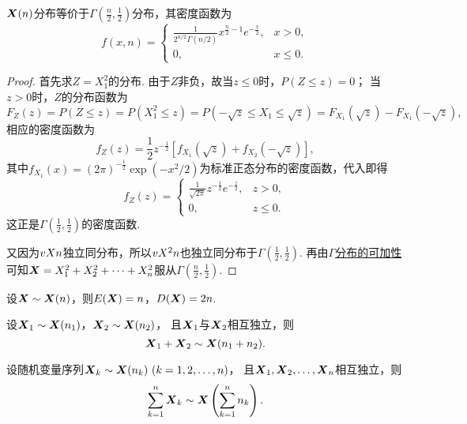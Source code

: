 \begin{theorem}\label{theorem:数理统计的基础知识.卡方分布的密度函数}
\(\boldsymbol{X}(n)\)分布等价于\(\Gamma\left(\frac{n}{2},\frac{1}{2}\right)\)分布，其密度函数为\[
f(x,n) = \left\{ \begin{array}{cl}
\frac{1}{2^{n/2} \Gamma(n/2)} x^{\frac{n}{2}-1} e^{-\frac{x}{2}}, & x > 0, \\
0, & x \leqslant 0.
\end{array} \right.
\]
\begin{proof}
首先求\(Z=X_1^2\)的分布.
由于\(Z\)非负，故当\(z \leqslant 0\)时，\(P(Z \leqslant z) = 0\)；
当\(z > 0\)时，\(Z\)的分布函数为\[
F_Z(z) = P(Z \leqslant z)
= P(X_1^2 \leqslant z)
= P(-\sqrt{z} \leqslant X_1 \leqslant \sqrt{z})
= F_{X_1}(\sqrt{z}) - F_{X_1}(-\sqrt{z}),
\]相应的密度函数为\[
f_Z(z) = \frac{1}{2} z^{-\frac{1}{2}} \left[
f_{X_1}(\sqrt{z}) + f_{X_2}(-\sqrt{z})
\right],
\]其中\(f_{X_1}(x) = (2\pi)^{-\frac{1}{2}} \exp(-x^2/2)\)为标准正态分布的密度函数，代入即得\[
f_Z(z) = \left\{ \begin{array}{cl}
\frac{1}{\sqrt{2\pi}} z^{-\frac{1}{2}} e^{-\frac{z}{2}}, & z>0, \\
0, & z \leqslant 0.
\end{array} \right.
\]这正是\(\Gamma\left(\frac{1}{2},\frac{1}{2}\right)\)的密度函数.

又因为\(v{X}{n}\)独立同分布，所以\(v{X^2}{n}\)也独立同分布于\(\Gamma\left(\frac{1}{2},\frac{1}{2}\right)\).
再由\hyperref[theorem:多维随机变量及其分布.伽马分布的可加性1]{\(\Gamma\)分布的可加性}可知\(\boldsymbol{X} = X_1^2+X_2^2+\dotsb+X_n^2\)服从\(\Gamma\left(\frac{n}{2},\frac{1}{2}\right)\).
\end{proof}
\end{theorem}

\begin{corollary}\label{theorem:数理统计的基础知识.卡方分布的数字特征}
设\(\boldsymbol{X} \sim \boldsymbol{X}(n)\)，则\(E(\boldsymbol{X}) = n\)，\(D(\boldsymbol{X}) = 2n\).
\end{corollary}

\begin{theorem}[可加性]\label{theorem:数理统计的基础知识.卡方分布的可加性1}
设\(\boldsymbol{X}_1 \sim \boldsymbol{X}(n_1)\)，\(\boldsymbol{X}_2 \sim \boldsymbol{X}(n_2)\)，%
且\(\boldsymbol{X}_1\)与\(\boldsymbol{X}_2\)相互独立，则\[
\boldsymbol{X}_1 + \boldsymbol{X}_2 \sim \boldsymbol{X}(n_1+n_2).
\]
\end{theorem}

\begin{corollary}\label{theorem:数理统计的基础知识.卡方分布的可加性2}
设随机变量序列\(\x_k \sim \x(n_k)\ (k=1,2,\dotsc,n)\)，%
且\(\boldsymbol{X}_1,\boldsymbol{X}_2,\dotsc,\boldsymbol{X}_n\)相互独立，则\[
\sum\limits_{k=1}^n{\boldsymbol{X}_k} \sim \boldsymbol{X}\left(\sum\limits_{k=1}^n{n_k}\right).
\]
\end{corollary}


